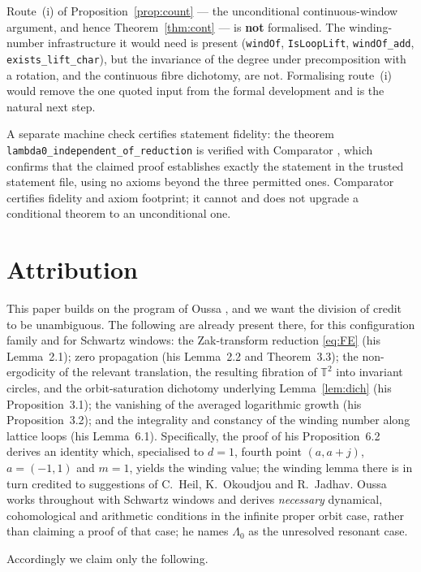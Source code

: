 \documentclass[11pt]{amsart}
\theoremstyle{remark}
\newcommand{\T}{\mathbb T}
\begin{document}
Route~(i) of Proposition~\ref{prop:count} --- the unconditional continuous-window argument, and
hence Theorem~\ref{thm:cont} --- is \textbf{not} formalised. The winding-number infrastructure
it would need is present (\texttt{windOf}, \texttt{IsLoopLift}, \texttt{windOf\_add},
\texttt{exists\_lift\_char}), but the invariance of the degree under precomposition with a
rotation, and the continuous fibre dichotomy, are not. Formalising route~(i) would remove the
one quoted input from the formal development and is the natural next step.

A separate machine check certifies statement fidelity: the theorem
\texttt{lambda0\_independent\_of\_reduction} is verified with Comparator
\cite{Comparator}, which confirms that the claimed proof establishes exactly the statement in
the trusted statement file, using no axioms beyond the three permitted ones. Comparator
certifies fidelity and axiom footprint; it cannot and does not upgrade a conditional theorem
to an unconditional one.

\section{Attribution}\label{sec:attribution}

This paper builds on the program of Oussa \cite{Oussa}, and we want the division of credit to
be unambiguous. The following are already present there, for this configuration family and for
Schwartz windows: the Zak-transform reduction \eqref{eq:FE} (his Lemma~2.1); zero propagation
(his Lemma~2.2 and Theorem~3.3); the non-ergodicity of the relevant translation, the resulting
fibration of $\T^2$ into invariant circles, and the orbit-saturation dichotomy underlying
Lemma~\ref{lem:dich} (his Proposition~3.1); the vanishing of the averaged logarithmic growth
(his Proposition~3.2); and the integrality and constancy of the winding number along lattice
loops (his Lemma~6.1). Specifically, the proof of his Proposition~6.2 derives an identity
which, specialised to $d=1$, fourth point $(a,a+j)$, $a=(-1,1)$ and $m=1$, yields the winding
value; the winding lemma there is in turn credited to suggestions of C.~Heil, K.~Okoudjou and
R.~Jadhav. Oussa works throughout with Schwartz windows and derives \emph{necessary}
dynamical, cohomological and arithmetic conditions in the infinite proper orbit case, rather
than claiming a proof of that case; he names $\Lambda_0$ as the unresolved resonant case.

Accordingly we claim only the following.
\end{document}
